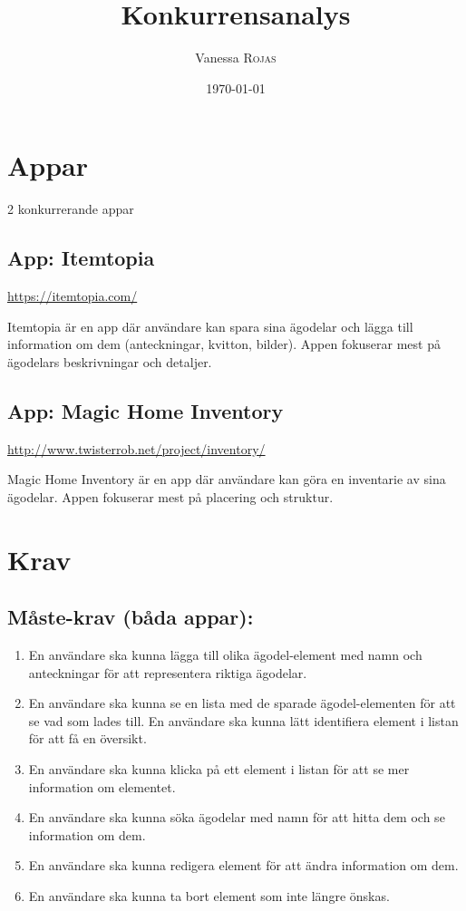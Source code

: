 \documentclass{article}
\title{Konkurrensanalys}
\author{Vanessa \textsc{Rojas}}
\date{\today}
\begin{document}
\maketitle

\section{Appar}

2 konkurrerande appar 

\subsection{App: Itemtopia}

\url{https://itemtopia.com/}

Itemtopia är en app där användare kan spara sina ägodelar och lägga till information om dem (anteckningar, kvitton, bilder). Appen fokuserar mest på ägodelars beskrivningar och detaljer.

\subsection{App: Magic Home Inventory}

\url{http://www.twisterrob.net/project/inventory/}

Magic Home Inventory är en app där användare kan göra en inventarie av sina ägodelar. Appen fokuserar mest på placering och struktur.

\section{Krav}

\subsection{Måste-krav (båda appar):}
\begin{enumerate}
\item En användare ska kunna lägga till olika ägodel-element med namn och anteckningar för att representera riktiga ägodelar.
\item En användare ska kunna se en lista med de sparade ägodel-elementen för att se vad som lades till.
En användare ska kunna lätt identifiera element i listan för att få en översikt.
\item En användare ska kunna klicka på ett element i listan för att se mer information om elementet.
\item En användare ska kunna söka ägodelar med namn för att hitta dem och se information om dem.
\item En användare ska kunna redigera element för att ändra information om dem.
\item En användare ska kunna ta bort element som inte längre önskas.
\end{enumerate}
\end{document}
